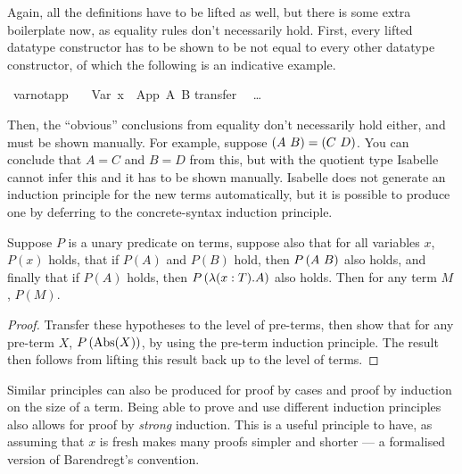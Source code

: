 Again, all the definitions have to be lifted as well, but there is some extra boilerplate now, as equality rules don't necessarily hold.
First, every lifted datatype constructor has to be shown to be not equal to every other datatype constructor, of which the following is an indicative example.

\begin{implementation}
\isamarkupfalse%
\ var{\isacharunderscore}not{\isacharunderscore}app{\isacharcolon}\isanewline
\ \ \ {\isachardoublequoteopen}Var\ x\ {\isasymnoteq}\ App\ A\ B{\isachardoublequoteclose}\isanewline
%
\isadelimproof
%
\endisadelimproof
%
\isatagproof
{}\isamarkupfalse%
{\isacharparenleft}transfer{\isacharparenright}\isanewline
\ \ \ldots\isanewline
{}\isamarkupfalse%
%
\endisatagproof
\end{implementation}

Then, the ``obvious'' conclusions from equality don't necessarily hold either, and must be shown manually.
For example, suppose \(\left(A\ B\right) = \left(C\ D\right)\).
You can conclude that \(A = C\) and \(B = D\) from this, but with the quotient type Isabelle cannot infer this and it has to be shown manually.
Isabelle does not generate an induction principle for the new terms automatically, but it is possible to produce one by deferring to the concrete-syntax induction principle.

\begin{lemma}
Suppose \(P\) is a unary predicate on terms, suppose also that for all variables \(x\), \(P(x)\) holds, that if \(P(A)\) and \(P(B)\) hold, then \(P\left(A\ B\right)\) also holds, and finally that if \(P(A)\) holds, then \(P\left(\lambda (x:T). A\right)\) also holds.
Then for any term \(M\), \(P(M)\).
\end{lemma}
\begin{proof}
Transfer these hypotheses to the level of pre-terms, then show that for any pre-term \(X\), \(P\left(\textrm{Abs}(X)\right)\), by using the pre-term induction principle.
The result then follows from lifting this result back up to the level of terms.
\end{proof}

Similar principles can also be produced for proof by cases and proof by induction on the size of a term.
Being able to prove and use different induction principles also allows for proof by \emph{strong} induction.
This is a useful principle to have, as assuming that \(x\) is fresh makes many proofs simpler and shorter --- a formalised version of Barendregt's convention.

